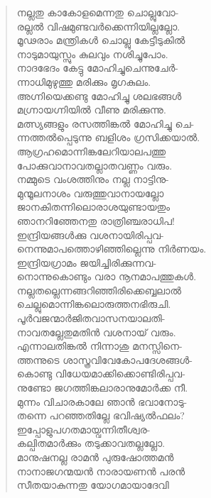 \begin{verse}
നല്ലതു കാകോളമെന്നതു ചൊല്ലുവോ-\\
രല്ലല്‍ വിഷമുണ്ടവര്‍ക്കെന്നിയില്ലല്ലോ.\\
മൂഢരാം മന്ത്രികള്‍ ചൊല്ലു കേട്ടീടുകില്‍\\
നാടുമായുസ്സും കുലവും നശിച്ചുപോം.\\
നാദഭേദം കേട്ടു മോഹിച്ചുചെന്നുചേര്‍-\\
ന്നാധിമുഴുത്തു മരിക്കും മൃഗകുലം.\\
അഗ്നിയെക്കണ്ടു മോഹിച്ചു ശലഭങ്ങള്‍\\
മഗ്ന്രായഗ്നിയില്‍ വീണു മരിക്കുന്നു.\\
മത്സ്യങ്ങളും രസത്തിങ്കല്‍ മോഹിച്ചു ചെ-\\
ന്നത്തല്‍പ്പെടുന്നു ബളിശം ഗ്രസിക്കയാല്‍.\\
ആഗ്രഹമൊന്നിങ്കലേറിയാലപത്തു\\
പോക്കുവാനാവതല്ലാതവണ്ണം വരും.\\
നമ്മുടെ വംശത്തിനും നല്ല നാട്ടിനു-\\
മുന്മൂലനാശം വരുത്തുവാനായല്ലോ\\
ജാനകിതന്നിലൊരാശയുണ്ടായതും\\
ഞാനറിഞ്ഞേനതു രാത്രിഞ്ചരാധിപ!\\
ഇന്ദ്രിയങ്ങള്‍ക്കു വശനായിരിപ്പവ-\\
നെന്നുമാപത്തൊഴിഞ്ഞില്ലെന്നു നിര്‍ണയം.\\
ഇന്ദ്രിയഗ്രാമം ജയിച്ചിരിക്കുന്നവ-\\
നൊന്നുകൊണ്ടും വരാ നൂനമാപത്തുകള്‍.\\
നല്ലതല്ലെന്നങ്ങറിഞ്ഞിരിക്കെബ്ബലാല്‍\\
ചെല്ലുമൊന്നിങ്കലൊരുത്തനഭിരുചി.\\
പൂര്‍വജന്മാര്‍ജിതവാസനയാലതി-\\
നാവതല്ലേതുമതിന്‍ വശനായ് വരും.\\
എന്നാലതിങ്കല്‍ നിന്നാശു മനസ്സിനെ-\\
ത്തന്നുടെ ശാസ്ത്രവിവേകോപദേശങ്ങള്‍-\\
കൊണ്ടു വിധേയമാക്കിക്കൊണ്ടിരിപ്പവ-\\
നുണ്ടോ ജഗത്തിങ്കലാരാനുമോര്‍ക്ക നീ.\\
മുന്നം വിചാരകാലേ ഞാന്‍ ഭവാനോടു-\\
തന്നെ പറഞ്ഞതില്ലേ ഭവിഷ്യല്‍ഫലം?\\
ഇപ്പോളുപഗതമായ്വന്നിതീശ്വര-\\
കല്പിതമാര്‍ക്കും തടുക്കാവതല്ലല്ലോ.\\
മാനുഷനല്ല രാമന്‍ പുരുഷോത്തമന്‍\\
നാനാജഗന്മയന്‍ നാരായണന്‍ പരന്‍\\
സീതയാകുന്നതു യോഗമായാദേവി\\

\end{verse}
